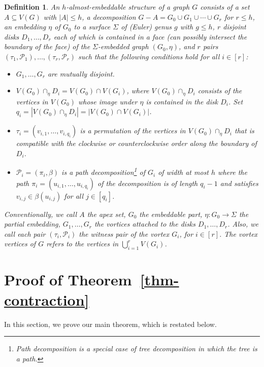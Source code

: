 \documentclass[a4paper,11pt]{article}
\numberwithin{lemma}{section}
\newtheorem{definition}[lemma]{Definition}
\begin{document}
\begin{definition}\label{def-almost}
 An $h$-\emph{almost-embeddable structure} of a graph $G$ consists of a set $A \subseteq V(G)$ with $|A| \leq h$, a decomposition $G-A = G_0 \cup G_1 \cup \cdots \cup G_r$ for $r \leq h$, an embedding $\eta$ of $G_0$ to a surface $\varSigma$ of (Euler) genus $g$ with $g \leq h$, $r$ disjoint disks $D_1,\dots,D_r$ each of which is contained in a face (can possibly intersect the boundary of the face) of the $\varSigma$-embedded graph $(G_0,\eta)$, and $r$ pairs $(\tau_1,\mathcal{P}_1),\dots,(\tau_r,\mathcal{P}_r)$ such that the following conditions hold for all $i \in [r]$:
 \begin{itemize}
  \item $G_1,\dots,G_r$ are mutually disjoint.
  \item $V(G_0) \cap_\eta D_i = V(G_0) \cap V(G_i)$, where $V(G_0) \cap_\eta D_i$ consists of the vertices in $V(G_0)$ whose image under $\eta$ is contained in the disk $D_i$.
   Set $q_i = |V(G_0) \cap_\eta D_i| = |V(G_0) \cap V(G_i)|$.
  \item $\tau_i = (v_{i,1},\dots,v_{i,q_i})$ is a permutation of the vertices in $V(G_0) \cap_\eta D_i$ that is compatible with the clockwise or counterclockwise order along the boundary of $D_i$.
  \item $\mathcal{P}_i = (\pi_i,\beta)$ is a path decomposition\footnote{Path decomposition is a special case of tree decomposition in which the tree is a path.} of $G_i$ of width at most $h$ where the path $\pi_i = (u_{i,1},\dots,u_{i,q_i})$ of the decomposition is of length $q_i - 1$ and satisfies $v_{i,j} \in \beta(u_{i,j})$ for all $j \in [q_i]$.
 \end{itemize}
 Conventionally, we call $A$ the \emph{apex set}, $G_0$ the \emph{embeddable part}, $\eta:G_0 \rightarrow \varSigma$ the \emph{partial embedding}, $G_1,\dots,G_r$ the \emph{vortices} attached to the disks $D_1,\dots,D_r$.
 Also, we call each pair $(\tau_i,\mathcal{P}_i)$ the \emph{witness pair} of the vortex $G_i$, for $i \in [r]$.
 The \emph{vortex vertices} of $G$ refers to the vertices in $\bigcup_{i=1}^r V(G_i)$.
\end{definition}
 

\section{Proof of Theorem~\ref{thm-contraction}}
\label{sec-proof}

In this section, we prove our main theorem, which is restated below.
\end{document}

